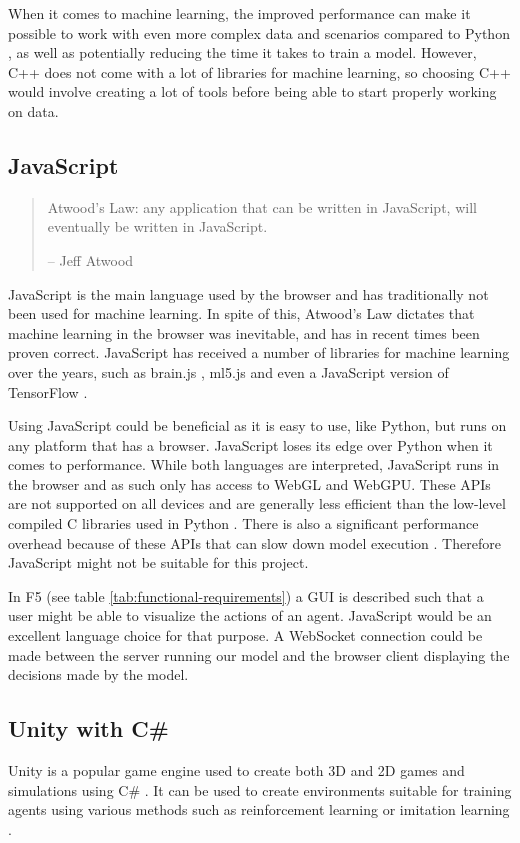 When it comes to machine learning, the improved performance can make it possible to work with even more complex data and scenarios compared 
to Python \cite{C++VsPythonML}, as well as potentially reducing the time it takes to train a model. However, C++ does not come with a lot of libraries
for machine learning, so choosing C++ would involve creating a lot of tools before being able to start properly working on data.
\clearpage

\subsection{JavaScript}
\begin{quote}
    Atwood's Law: any application that can be written in JavaScript, will eventually be written in JavaScript.
    
    -- Jeff Atwood \cite{AtwoodsLaw}
\end{quote}

JavaScript is the main language used by the browser and has traditionally not been used for machine learning. In spite of this, Atwood's Law \cite{AtwoodsLaw} dictates
that machine learning in the browser was inevitable, and has in recent times been proven correct. JavaScript has received a number of libraries
for machine learning over the years, such as brain.js \cite{BrainJS}, ml5.js \cite{ML5JS} and even a JavaScript version of TensorFlow \cite{TensorFlowJS}.

Using JavaScript could be beneficial as it is easy to use, like Python, but runs on any platform that has a browser. JavaScript loses its edge over Python
when it comes to performance. While both languages are interpreted, JavaScript runs in the browser and as such only has access to WebGL and WebGPU. 
These APIs are not supported on all devices and are generally less efficient than the low-level compiled C libraries used in Python \cite{WebGPUvsCUDA}.
There is also a significant performance overhead because of these APIs that can slow down model execution \cite{DeepLearningInBrowsers}. Therefore JavaScript
might not be suitable for this project.

In F5 (see table \ref{tab:functional-requirements}) a GUI is described such that a user might be able to visualize the actions of an agent. JavaScript would be an 
excellent language choice for that purpose. A WebSocket connection could be made between the server running our model and the browser client displaying
the decisions made by the model.

\subsection{Unity with C\#}
Unity is a popular game engine used to create both 3D and 2D games and simulations using C\# \cite{Unity}. It can be used to create environments suitable
for training agents using various methods such as reinforcement learning or imitation learning \cite{UnityMLAgents}. 

